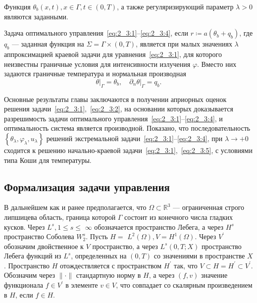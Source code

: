 Функция $\theta_{b}(x, t), x \in \Gamma, t \in(0, T)$,
а также регуляризирующий параметр $\lambda>0$ являются заданными.

Задача оптимального управления~\eqref{eq:2_3:1}--\eqref{eq:2_3:4},
если $r \coloneqq a\left(\theta_{b}+q_{b}\right)$,
где $q_{b}$ — заданная функция на $\Sigma =\Gamma \times(0, T)$,
является при малых значениях $\lambda$ аппроксимацией краевой
задачи для уравнения~\eqref{eq:2_3:1},
для которого неизвестны граничные условия для интенсивности излучения $\varphi$.
Вместо них задаются граничные температура и нормальная производная
\begin{equation}
    \label{eq:2_3:5}
    \left.\theta\right|_{\Gamma}=\theta_{b},
    \left.\quad \partial_{n} \theta\right|_{\Gamma}=q_{b}.
\end{equation}

Основные результаты главы заключаются в получении априорных
оценок решения задачи~\eqref{eq:2_3:1},~\eqref{eq:2_3:2},
на основании которых доказывается разрешимость задачи
оптимального управления~\eqref{eq:2_3:1}--\eqref{eq:2_3:4},
и оптимальность система является производной.
Показано, что последовательность
$\left\{\theta_{\lambda}, \varphi_{\lambda}, u_{\lambda}\right\}$
решений экстремальной задачи~\eqref{eq:2_3:1}--\eqref{eq:2_3:4},
при $ \lambda \rightarrow+0$
сходится к решению начально-краевой задачи~\eqref{eq:2_3:1},~\eqref{eq:2_3:5},
с условиями типа Коши для температуры.

\subsection{Формализация задачи управления}\label{subsec:ch2/sec3/formalization}
В дальнейшем как и ранее предполагается,
что $\Omega \subset \mathbb{R}^{3}$ — ограниченная строго липшицева область,
граница которой $\Gamma$ состоит из конечного числа гладких кусков.
Через $L^{s}, 1 \leq s \leq$ $\infty$
обозначается пространство Лебега, а через $H^{s}$
пространство Соболева $W_{2}^{s}$.
Пусть $H=$ $L^{2}(\Omega), V=H^{1}(\Omega)$.
Через $V^{\prime}$ обозначим двойственное к $V$ пространство,
а через $L^{s}(0, T; X)$
пространство Лебега функций из $L^{s}$, определенных
на $(0, T)$ со значениями в пространстве $X$.
Пространство $H$ отождествляется с пространством
$H^{\prime}$ так, что $V \subset H=H^{\prime} \subset V^{\prime}$.
Обозначим через $\|\cdot\|$ стандартную норму в $H$, а через $(f, v)$
значение функционала $f \in V^{\prime}$ в элементе $v \in V$,
что совпадает со скалярным произведением в $H$, если $f \in H$.


